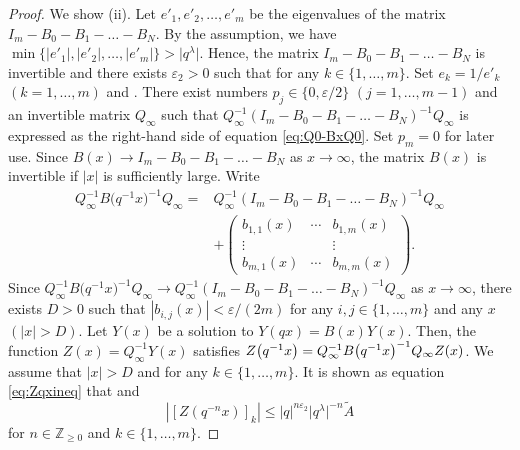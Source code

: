 \documentclass[10pt,a4paper]{amsart}
\begin{document}
\begin{proof}
We show (ii).
Let $e'_1, e'_2, \dots ,e'_m$ be the eigenvalues of the matrix $I_m- B_0 -B_1 - \dots - B_N$.
By the assumption, we have $\min \{ |e'_1|, |e'_2|, \dots , |e'_m| \} > \big|q^{\lambda }\big|$.
Hence, the matrix $I_m -B_0 -B_1 - \dots - B_N$ is invertible and there exists $\varepsilon _2 >0$ such that  for any $k \in \{1, \dots ,m \}$.
Set $e_k =1/e'_k $ $(k=1,\dots ,m )$ and .
There exist numbers $p_j \in \{ 0, \varepsilon /2 \}$ $(j=1, \dots , m-1)$ and an invertible matrix $Q_{\infty }$ such that $Q_{\infty }^{-1} ( I_m -B_0 -B_1 - \dots - B_N ) ^{-1} Q_{\infty }$ is expressed as the right-hand side of equation \eqref{eq:Q0-BxQ0}.
Set $p_m=0$ for later use.
Since $B(x) \to I_m -B_0 -B_1 - \dots - B_N $ as $x \to \infty $, the matrix $B(x)$ is invertible if $|x|$ is sufficiently large.
Write
\begin{align*}
 Q_{\infty }^{-1} B\bigl(q^{-1} x\bigr)^{-1} Q_{\infty } = {}& Q_{\infty }^{-1} ( I_m -B_0 -B_1 - \dots - B_N ) ^{-1} Q_{\infty } \\
& + \begin{pmatrix}
b_{1,1} (x) & \cdots & b_{1,m} (x) \\
\vdots & & \vdots \\
 b_{m,1} (x) & \cdots & b_{m,m} (x)
\end{pmatrix}.
\end{align*}
Since $Q_{\infty }^{-1} B\bigl(q^{-1} x\bigr)^{-1} Q_{\infty } \to Q_{\infty }^{-1} ( I_m -B_0 -B_1 - \dots - B_N ) ^{-1} Q_{\infty } $ as $x \to \infty $, there exists $D >0$ such that $|b_{i,j}(x)| < \varepsilon /(2m)$ for any $i,j \in \{1, \dots ,m \}$ and any $x$ $(|x| > D )$.
Let $Y (x)$ be a solution to $Y (qx) = B(x)Y (x)$.
Then, the function $Z(x) = Q_{\infty }^{-1} Y (x)$ satisfies $Z\bigl(q^{-1}x\bigr) = \smash{Q_{\infty }^{-1} B\bigl(q^{-1}x\bigr) ^{-1} Q_{\infty } Z(x)}$.
We assume that $|x| > D $ and  for any $k \in \{1, \dots ,m \}$.
It is shown as equation \eqref{eq:Zqxineq} that  and
\begin{equation}
 | [Z(q^{-n} x )]_k | \leq |q | ^{n \varepsilon _2} \big|q ^{\lambda }\big|^{-n} \widetilde{A} \label{eq:ineq2}
\end{equation}
for $n \in \mathbb{Z} _{\geq 0} $ and $k \in \{1, \dots ,m \}$.


\end{proof}
\end{document}
